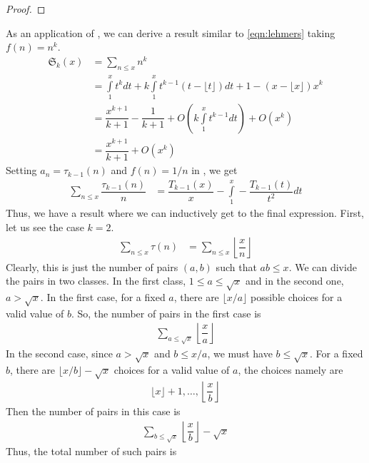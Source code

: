 \documentclass[elemannt.tex]{subfile}
\begin{document}
		\begin{proof}
			
		\end{proof}
	As an application of , we can derive a result similar to \ref{eqn:lehmers} taking  $f(n)=n^{k}$.
		\begin{align*}
			\mathfrak{S}_{k}(x)
				& = \sum_{n\leq x}n^{k}\\
				& = \int\limits_{1}^{x}t^{k}dt+k\int\limits_{1}^{x}t^{k-1}(t-\lfloor{t}\rfloor)dt+1-(x-\lfloor{x}\rfloor)x^{k}\\
				& = \dfrac{x^{k+1}}{k+1}-\dfrac{1}{k+1}+O\left(k\int\limits_{1}^{x}t^{k-1}dt\right)+O(x^{k})\\
				& = \dfrac{x^{k+1}}{k+1}+O(x^{k})
		\end{align*}
	Setting $a_{n}=\tau_{k-1}(n)$ and $f(n)=1/n$ in , we get
		\begin{align*}
			\sum_{n\leq x}\dfrac{\tau_{k-1}(n)}{n}
				& = \dfrac{T_{k-1}(x)}{x}-\int\limits_{1}^{x}-\dfrac{T_{k-1}(t)}{t^{2}}dt
		\end{align*}
	Thus, we have a result where we can inductively get to the final expression. First, let us see the case $k=2$.
		\begin{align*}
			\sum_{n\leq x}\tau(n)
				& = \sum_{n\leq x}\left\lfloor{\dfrac{x}{n}}\right\rfloor
		\end{align*}
	Clearly, this is just the number of pairs $(a,b)$ such that $ab\leq x$. We can divide the pairs in two classes. In the first class, $1\leq a\leq \sqrt{x}$ and in the second one, $a>\sqrt{x}$. In the first case, for a fixed $a$, there are $\lfloor{x/a}\rfloor$ possible choices for a valid value of $b$. So, the number of pairs in the first case is
		\begin{align*}
			\sum_{a\leq \sqrt{x}}\left\lfloor{\dfrac{x}{a}}\right\rfloor
		\end{align*}
	In the second case, since $a>\sqrt{x}$ and $b\leq x/a$, we must have $b\leq \sqrt{x}$. For a fixed $b$, there are $\lfloor{x/b}\rfloor-\sqrt{x}$ choices for a valid value of $a$, the choices namely are
		\begin{align*}
			\lfloor{x}\rfloor+1,\ldots,\left\lfloor{\dfrac{x}{b}}\right\rfloor
		\end{align*}
	Then the number of pairs in this case is
		\begin{align*}
			\sum_{b\leq \sqrt{x}}\left\lfloor{\dfrac{x}{b}}\right\rfloor-\sqrt{x}
		\end{align*}
	Thus, the total number of such pairs is
\end{document}
